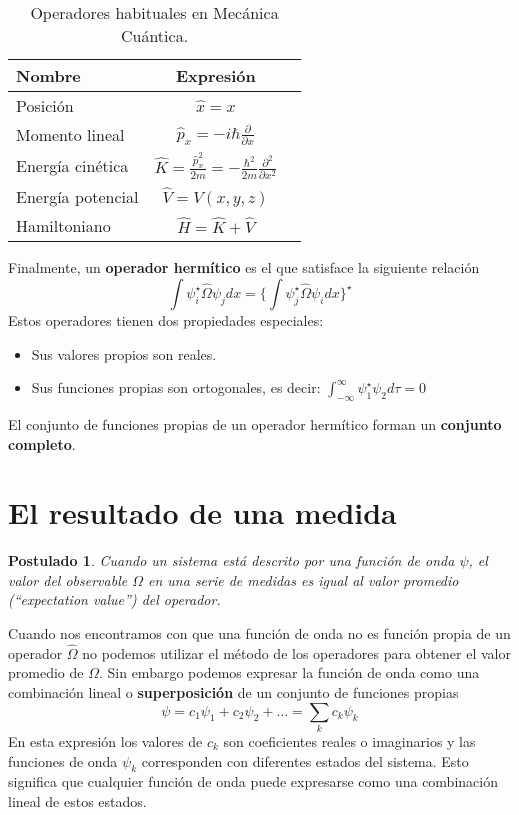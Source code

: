 \documentclass{tufte-handout}
\newtheorem{theorem}{Postulado}
\begin{document}
\begin{table}[h]
  \begin{center}
    \small
    \begin{tabular}{lcr}
      \toprule
      Nombre & Expresión \\
      \midrule
      Posición & $\hat{x}=x$ \\
      Momento lineal & $\hat{p}_x=-i\hbar \frac{\partial}{\partial x}$ \\
      Energía cinética & $\hat{K}=\frac{\hat{p}_x^2}{2m}=
      -\frac{\hbar^2}{2m}\frac{\partial^2}{\partial x^2}$\\
      Energía potencial & $\hat{V}=V(x,y,z)$ \\
      Hamiltoniano & $\hat{H}=\hat{K}+\hat{V}$ \\
      \bottomrule
    \end{tabular}
  \end{center}
  \caption{Operadores habituales en Mecánica Cuántica.}
  \label{tab:operators}
\end{table}

Finalmente, un \textbf{operador hermítico} es el que
satisface la siguiente relación
\begin{equation}
    \int\psi_i^\star\hat{\Omega}\psi_jdx=
    \bigg\{\int\psi_j^\star\hat{\Omega}\psi_idx\bigg\}^\star
\end{equation}
Estos operadores tienen dos propiedades especiales:
\begin{itemize}
    \item Sus valores propios son reales.
    \item Sus funciones propias son ortogonales, es decir:
    $\int_{-\infty}^\infty\psi_1^\star\psi_2d\tau=0$
\end{itemize}
El conjunto de funciones propias de un operador 
    hermítico forman un \textbf{conjunto completo}.

\section{El resultado de una medida}
\begin{theorem}
Cuando un sistema está descrito por una función de onda
$\psi$, el valor del observable $\Omega$ en una serie 
de medidas es igual al valor promedio (“expectation 
value”) del operador.
\end{theorem}
Cuando nos encontramos con que una función de onda no es
función propia de un operador $\hat{\Omega}$ no podemos
utilizar el método de los operadores para obtener el valor
promedio de $\Omega$. Sin embargo podemos expresar la
función de onda como una combinación lineal o
\textbf{superposición} de un conjunto de funciones
propias
\begin{equation}
\psi =  c_1\psi_1 + c_2\psi_2 + ... = \sum_kc_k\psi_k    
\end{equation}
En esta expresión los valores de $c_k$ son coeficientes
reales o imaginarios y las funciones de onda $\psi_k$
corresponden con diferentes estados del sistema. Esto
significa que cualquier función de onda puede 
expresarse como una combinación lineal de estos estados.
\end{document}
